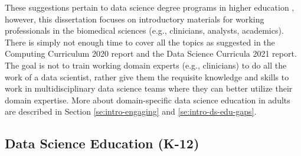 \documentclass[010-intro.tex]{subfiles}
\begin{document}
    These suggestions pertain to data science degree programs in higher education
    \cite{cc2020, ccdsc2021},
    however, this dissertation focuses on introductory materials for working professionals in the biomedical sciences
    (e.g., clinicians, analysts, academics).
    There is simply not enough time to cover all the topics as suggested in the
    Computing Curriculum 2020 report and the Data Science Curricula 2021 report.
    The goal is not to train working domain experts (e.g., clinicians) to do all the work of a data scientist,
    rather give them the requisite knowledge and skills to work in multidisciplinary data science teams
    where they can better utilize their domain expertise.
    More about domain-specific data science education in adults are described in Section \ref{se:intro-engaging} and \ref{se:intro-ds-edu-gaps}.


\subsection{Data Science Education (K-12)}
\end{document}
